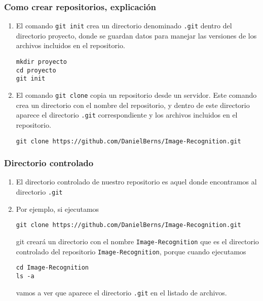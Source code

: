 \documentclass{beamer}
\begin{document}
\begin{frame}[fragile]
\frametitle{Como crear repositorios, explicaci\'{o}n}

\begin{enumerate}
\item El comando \verb|git init| crea un directorio denominado \verb|.git| dentro del directorio proyecto, donde se guardan datos para manejar las versiones de los archivos incluidos en el repositorio.
\begin{verbatim}
mkdir proyecto
cd proyecto
git init
\end{verbatim}

\item El comando \verb|git clone| copia un repositorio desde un servidor. Este comando crea un directorio con el nombre del repositorio, y dentro de este directorio aparece el directorio \verb|.git| correspondiente y los archivos incluidos en el repositorio.
\begin{verbatim}
git clone https://github.com/DanielBerns/Image-Recognition.git
\end{verbatim}
\end{enumerate}

\end{frame}

\begin{frame}[fragile]
\frametitle{Directorio controlado}

\begin{enumerate}
\item El directorio controlado de nuestro repositorio es aquel donde encontramos al directorio \verb|.git|

\item Por ejemplo, si ejecutamos
\begin{verbatim}
git clone https://github.com/DanielBerns/Image-Recognition.git
\end{verbatim}
git crear\'{a} un directorio con el nombre \verb|Image-Recognition| que es el directorio controlado del repositorio \verb|Image-Recognition|, porque cuando ejecutamos
\begin{verbatim}
cd Image-Recognition
ls -a
\end{verbatim}
vamos a ver que aparece el directorio \verb|.git| en el listado de archivos.
\end{enumerate}

\end{frame}
\end{document}
